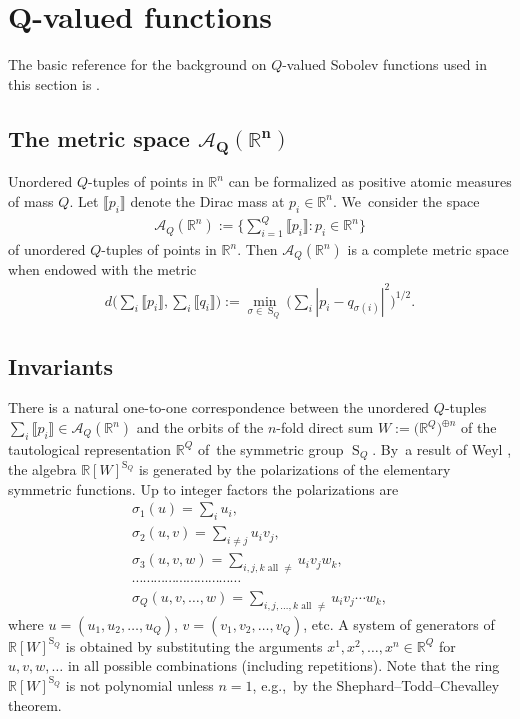 \documentclass[pdftex]{sigma}
\numberwithin{equation}{section}
\def\si{\sigma}
\def\R{\mathbb{R}}
\def\cA{\mathcal{A}}
\let\on=\operatorname
\begin{document}
\section[Q-valued functions]{$\boldsymbol Q$-valued functions} \label{sec:Q-valued}

The basic reference for the background on $Q$-valued Sobolev functions used in this section is \cite{De-LellisSpadaro11}.

\subsection{The metric space $\boldsymbol{\cA_Q(\R^n)}$}

Unordered $Q$-tuples of points in $\R^n$ can be formalized as positive atomic measures of mass $Q$.
Let $\llbracket p_i \rrbracket$ denote the Dirac mass at $p_i \in \R^n$. We~consider the space
\begin{gather*}
 \cA_Q(\R^n) := \bigg\{ \sum_{i = 1}^Q \llbracket p_i \rrbracket \colon p_i \in \R^n\bigg\}
\end{gather*}
of unordered $Q$-tuples of points in $\R^n$. Then $\cA_Q(\R^n)$ is a complete metric space when endowed with the metric
\begin{gather} \label{Qmetric}
 d\bigg(\sum_i \llbracket p_i \rrbracket, \sum_i \llbracket q_i \rrbracket\bigg)
 := \min_{\si \in \on{S}_Q} \bigg(\sum_i |p_i - q_{\si(i)}|^2\bigg)^{1/2}.
\end{gather}

\subsection{Invariants}

There is a natural one-to-one correspondence between
the unordered $Q$-tuples $\sum_i \llbracket p_i \rrbracket \in \cA_Q(\R^n)$
and the orbits of the $n$-fold direct sum $W := \big(\R^Q\big)^{\oplus n}$ of the tautological representation $\R^Q$ of~the
symmetric group $\on{S}_Q$. By~a result of Weyl \cite{Weyl39}, the algebra $\R[W]^{\on{S}_Q}$ is generated by the polarizations of the elementary symmetric functions.
Up to integer factors the polarizations are
\begin{gather*}
 \si_1(u) = \sum_i u_i,
 \\
 \si_2(u,v) = \sum_{i \ne j} u_i v_j,
 \\
 \si_3(u,v,w) = \sum_{i,j,k \text{ all } \ne } u_i v_j w_k,
 \\
 \cdots\cdots\cdots\cdots\cdots\cdots\cdots\cdots\cdots\cdots
 \\
 \si_Q(u,v,\dots,w) = \sum_{i,j,\dots,k \text{ all } \ne } u_i v_j\cdots w_k,
\end{gather*}
where $u = (u_1,u_2,\dots,u_Q)$, $v = (v_1,v_2,\dots,v_Q)$, etc.
A system of generators of $\R[W]^{\on{S}_Q}$ is obtained by substituting the arguments $x^1, x^2, \dots, x^n \in \R^Q$
for $u,v,w,\dots$ in all possible combinations (including repetitions).
Note that the ring $\R[W]^{\on{S}_Q}$ is not polynomial unless $n = 1$, e.g.,\ by the Shephard--Todd--Chevalley theorem.
\end{document}
